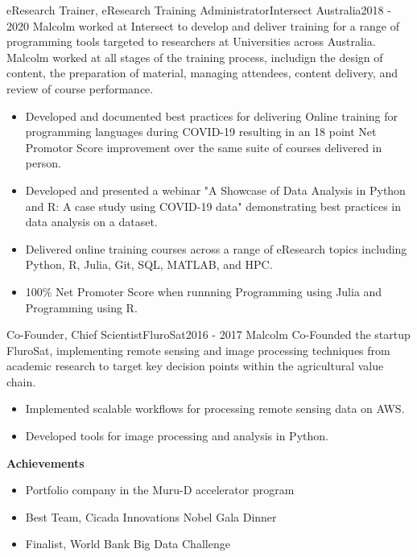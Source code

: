 \pagebreak
\begin{cventry}{eResearch Trainer, eResearch Training Administrator}{Intersect Australia}{}{2018 - 2020}
  Malcolm worked at Intersect to develop and deliver training 
  for a range of programming tools
  targeted to researchers at Universities across Australia.
  Malcolm worked at all stages of the training process, 
  includign the design of content, 
  the preparation of material, managing attendees, 
  content delivery, and review of course performance.
  \begin{itemize}
    \item Developed and documented best practices for delivering Online
      training for programming languages during COVID-19 resulting in an
      18 point Net Promotor Score improvement over 
      the same suite of courses delivered in person.
    \item Developed and presented a webinar
      {"A Showcase of Data Analysis in Python and R: A case study using COVID-19 data"}
      demonstrating best practices in data analysis on a dataset.
    \item Delivered online training courses across a range of eResearch topics
      including Python, R, Julia, Git, SQL, MATLAB, and HPC.
    \item 100\% Net Promoter Score when runnning Programming using Julia and Programming using R.
  \end{itemize}
\end{cventry}

\begin{cventry}{Co-Founder, Chief Scientist}{FluroSat}{}{2016 - 2017}
  Malcolm Co-Founded the startup FluroSat, 
  implementing remote sensing and image processing techniques 
  from academic research to target key decision points 
  within the agricultural value chain.
  \begin{itemize}
    \item Implemented scalable workflows for processing remote sensing data on AWS.
    \item Developed tools for image processing and analysis in Python.
    \end{itemize}
  \textbf{Achievements}
  \begin{itemize}
      \item Portfolio company in the Muru-D accelerator program
      \item Best Team, Cicada Innovations Nobel Gala Dinner
      \item Finalist, World Bank Big Data Challenge
  \end{itemize}
\end{cventry}

